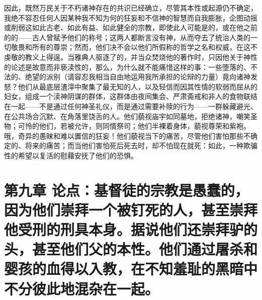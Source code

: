 因此，既然万民关于不朽诸神存在的共识已经确立，尽管其本性或起源仍不确定，我绝不容忍任何人因某种我不知为何的狂妄和不信神的智慧而自我膨胀，企图动摇或削弱这如此古老、如此有益、如此健全的宗教，即使此人可能是的，或在他之前的的——古人曾赋予他们的称号；这两人都断言没有神，从而夺去了统治人类的一切敬畏和所有的尊崇；然而，他们决不会以他们所假称的哲学之名和权威，在这不虔敬的教义上得逞。当雅典人驱逐了的，并当众焚烧他的著作时，只因他关于神性的论述是故意而非亵渎性的，那么，为什么就不能痛惜这样的事：一些堕落的、不法的、绝望的派别（请容忍我相当自由地运用我所承担的论辩的力量）竟向诸神发怒？他们从最底层渣滓中聚集了最无知的人，以及轻信而因其性情的软弱而屈从的妇女，组成一个渎神阴谋的群体，这群体由夜间集会、严肃斋戒和非人的食物联结在一起——不是通过任何神圣礼仪，而是通过需要补赎的行为——一群躲藏避光、在公共场合沉默、在角落里饶舌的人。他们藐视庙宇如同墓地，拒绝诸神，嘲笑圣物；可怜的他们，若被允许，则同情祭司；他们半裸着身体，藐视尊荣和紫袍。哦，奇异的愚昧和难以置信的狂妄！他们藐视当下的痛苦，尽管他们害怕那些不确定的、将来的痛苦；而当他们害怕死后死去时，却不怕现在就死：如此，一种欺骗性的希望以复活的慰藉安抚了他们的恐惧。\par


\section{第九章 论点：基督徒的宗教是愚蠢的，因为他们崇拜一个被钉死的人，甚至崇拜他受刑的刑具本身。据说他们还崇拜驴的头，甚至他们父的本性。他们通过屠杀和婴孩的血得以入教，在不知羞耻的黑暗中不分彼此地混杂在一起。}

